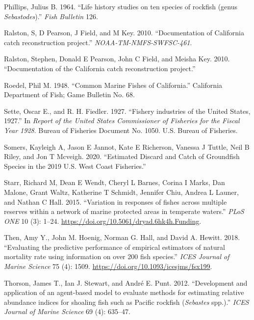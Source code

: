 \documentclass[11pt,
  english,
  a4paper,
]{article}
\newlength{\cslhangindent}
\newenvironment{CSLReferences}[2] %
 {%
  \setlength{\parindent}{0pt}
  \ifodd #1 \everypar{\setlength{\hangindent}{\cslhangindent}}\ignorespaces\fi
  \ifnum #2 > 0
  \setlength{\parskip}{#2\baselineskip}
  \fi
 }%
 {}
\begin{document}
\begin{CSLReferences}{1}{0}
\leavevmode{}%
Phillips, Julius B. 1964. {``{Life history studies on ten species of rockfish (genus \emph{Sebastodes})}.''} \emph{Fish Bulletin} 126.

\leavevmode{}%
Ralston, S, D Pearson, J Field, and M Key. 2010. {``{Documentation of California catch reconstruction project.}''} \emph{NOAA-TM-NMFS-SWFSC-461}.

\leavevmode{}%
Ralston, Stephen, Donald E Pearson, John C Field, and Meisha Key. 2010. {``{Documentation of the California catch reconstruction project}.''}

\leavevmode{}%
Roedel, Phil M. 1948. {``{Common Marine Fishes of California}.''} California Department of Fish; Game Bulletin No. 68.

\leavevmode{}%
Sette, Oscar E., and R. H. Fiedler. 1927. {``{Fishery industries of the United States, 1927}.''} In \emph{Report of the United States Commissioner of Fisheries for the Fiscal Year 1928}. Bureau of Fisheries Document No. 1050. U.S. Bureau of Fisheries.

\leavevmode{}%
Somers, Kayleigh A, Jason E Jannot, Kate E Richerson, Vanessa J Tuttle, Neil B Riley, and Jon T Mcveigh. 2020. {``{Estimated Discard and Catch of Groundfish Species in the 2019 U.S. West Coast Fisheries}.''}

\leavevmode{}%
Starr, Richard M, Dean E Wendt, Cheryl L Barnes, Corina I Marks, Dan Malone, Grant Waltz, Katherine T Schmidt, Jennifer Chiu, Andrea L Launer, and Nathan C Hall. 2015. {``{Variation in responses of fishes across multiple reserves within a network of marine protected areas in temperate waters}.''} \emph{PLoS ONE} 10 (3): 1--24. \url{https://doi.org/10.5061/dryad.6hk4h.Funding}.

\leavevmode{}%
Then, Amy Y., John M. Hoenig, Norman G. Hall, and David A. Hewitt. 2018. {``{Evaluating the predictive performance of empirical estimators of natural mortality rate using information on over 200 fish species}.''} \emph{ICES Journal of Marine Science} 75 (4): 1509. \url{https://doi.org/10.1093/icesjms/fsx199}.

\leavevmode{}%
Thorson, James T., Ian J. Stewart, and André E. Punt. 2012. {``{Development and application of an agent-based model to evaluate methods for estimating relative abundance indices for shoaling fish such as Pacific rockfish (\emph{Sebastes} spp.)}.''} \emph{ICES Journal of Marine Science} 69 (4): 635--47.


\end{CSLReferences}
\end{document}
